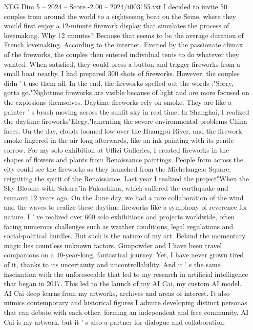 \begin{textsample}{NEG Dim 5 – 2024 – Score -2.00 – 2024/t003155.txt}
I decided to invite 50 couples from around the world to a sightseeing boat on the Seine, where they would first enjoy a 12-minute firework display that simulates the process of lovemaking.
Why 12 minutes?
Because that seems to be the average duration of French lovemaking.
According to the internet.
Excited by the passionate climax of the fireworks, the couples then entered individual tents to do whatever they wanted.
When satisfied, they could press a button and trigger fireworks from a small boat nearby.
I had prepared 300 shots of fireworks.
However, the couples didn ' t use them all.
In the end, the fireworks spelled out the words :"Sorry, gotta go."Nighttime fireworks are visible because of light and are more focused on the explosions themselves.
Daytime fireworks rely on smoke.
They are like a painter ' s brush moving across the sunlit sky in real time.
In Shanghai, I realized the daytime fireworks"Elegy,"lamenting the severe environmental problems China faces.
On the day, clouds loomed low over the Huangpu River, and the firework smoke lingered in the air long afterwards, like an ink painting with its gentle sorrow.
For my solo exhibition at Uffizi Galleries, I created fireworks in the shapes of flowers and plants from Renaissance paintings.
People from across the city could see the fireworks as they launched from the Michelangelo Square, reigniting the spirit of the Renaissance.
Last year I realized the project"When the Sky Blooms with Sakura"in Fukushima, which suffered the earthquake and tsunami 12 years ago.
On the June day, we had a rare collaboration of the wind and the waves to realize these daytime fireworks like a symphony of reverence for nature.
I ' ve realized over 600 solo exhibitions and projects worldwide, often facing numerous challenges such as weather conditions, legal regulations and social-political hurdles.
But such is the nature of my art.
Behind the momentary magic lies countless unknown factors.
Gunpowder and I have been travel companions on a 40-year-long, fantastical journey.
Yet, I have never grown tired of it, thanks to its uncertainty and uncontrollability.
And it ' s the same fascination with the unforeseeable that led to my research in artificial intelligence that began in 2017.
This led to the launch of my AI Cai, my custom AI model.
AI Cai deep learns from my artworks, archives and areas of interest.
It also mimics contemporary and historical figures I admire developing distinct personas that can debate with each other, forming an independent and free community.
AI Cai is my artwork, but it ' s also a partner for dialogue and collaboration.

\end{textsample}

